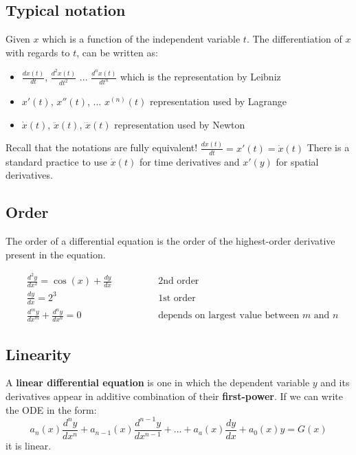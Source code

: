 \subsection*{Typical notation}
Given $x$ which is a function of the independent variable $t$. The differentiation of $x$ with regards to $t$, can be written as:
\vspace{0.5cm}
\begin{itemize}
 \item $\frac{d x(t)}{d t}$, $\frac{d^2 x(t)}{d t^2}$ ... $\frac{d^n x(t)}{d t^n}$ which is the representation by Leibniz \vspace{0.5cm}
 \item  $x'(t)$, $x''(t)$, ...  $x^{(n)}(t)$ representation used by Lagrange \vspace{0.5cm}
 \item $\dot{x}(t)$, $\ddot{x}(t)$, $\dddot{x}(t)$  representation used by Newton
\end{itemize}
\vspace{0.5cm}
Recall that the notations are fully equivalent!
$\frac{d x(t)}{d t}= x'(t) = \dot{x}(t)$ 
There is a standard practice to use $ \dot{x}(t)$ for time derivatives and $x'(y)$ for spatial derivatives.


\subsection*{Order}
The order of a differential equation is the order of the highest-order derivative present in the equation.
\begin{exmp}{}
\begin{eqnarray*}
&\frac{d^2 y}{d x^2} = \cos(x)+\frac{d y}{d x}\qquad \qquad & \text{2nd order}\\
&\frac{d y}{d x} = 2^3 & \text{1st order}\\
&\frac{d^m y}{d x^m} +\frac{d^n y}{d x^n}= 0 & \text{depends on largest value between $m$ and $n$}
\end{eqnarray*}
\end{exmp}

\subsection*{Linearity}
A \textbf{linear differential equation} is one in which the dependent variable $y$ and its derivatives appear in additive combination of their \textbf{first-power}. If we can write the ODE in the form:
\begin{equation}
\boxed{
a_n(x)\frac{d^n y}{dx^n}+a_{n-1}(x)\frac{d^{n-1} y}{dx^{n-1}}+\hdots+a_a(x)\frac{d y}{dx}+a_0(x)y=G(x)}
\label{GeneralForm}
\end{equation}
it is linear.

